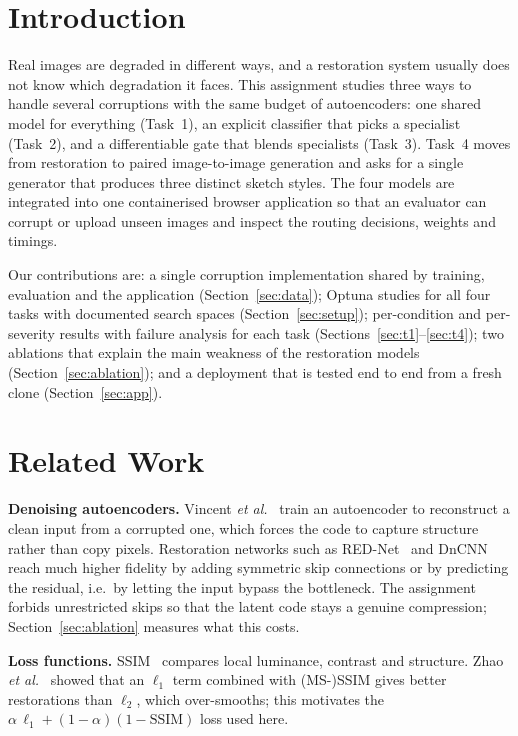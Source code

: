 \documentclass[conference]{IEEEtran}
\begin{document}
\section{Introduction}
Real images are degraded in different ways, and a restoration system usually does not know which degradation it
faces. This assignment studies three ways to handle several corruptions with the same budget of autoencoders: one
shared model for everything (Task~1), an explicit classifier that picks a specialist (Task~2), and a differentiable
gate that blends specialists (Task~3). Task~4 moves from restoration to paired image-to-image generation and asks
for a single generator that produces three distinct sketch styles. The four models are integrated into one
containerised browser application so that an evaluator can corrupt or upload unseen images and inspect the routing
decisions, weights and timings.

Our contributions are: a single corruption implementation shared by training, evaluation and the application
(Section~\ref{sec:data}); Optuna studies for all four tasks with documented search spaces
(Section~\ref{sec:setup}); per-condition and per-severity results with failure analysis for each task
(Sections~\ref{sec:t1}--\ref{sec:t4}); two ablations that explain the main weakness of the restoration models
(Section~\ref{sec:ablation}); and a deployment that is tested end to end from a fresh clone
(Section~\ref{sec:app}).

\section{Related Work}
\textbf{Denoising autoencoders.} Vincent \emph{et al.}~\cite{vincent2008,vincent2010} train an autoencoder to
reconstruct a clean input from a corrupted one, which forces the code to capture structure rather than copy pixels.
Restoration networks such as RED-Net~\cite{mao2016} and DnCNN~\cite{zhang2017} reach much higher fidelity by adding
symmetric skip connections or by predicting the residual, i.e.\ by letting the input bypass the bottleneck. The
assignment forbids unrestricted skips so that the latent code stays a genuine compression; Section~\ref{sec:ablation}
measures what this costs.

\textbf{Loss functions.} SSIM~\cite{wang2004} compares local luminance, contrast and structure. Zhao
\emph{et al.}~\cite{zhao2017} showed that an $\ell_1$ term combined with (MS-)SSIM gives better restorations than
$\ell_2$, which over-smooths; this motivates the $\alpha\,\ell_1 + (1-\alpha)(1-\mathrm{SSIM})$ loss used here.
\end{document}
